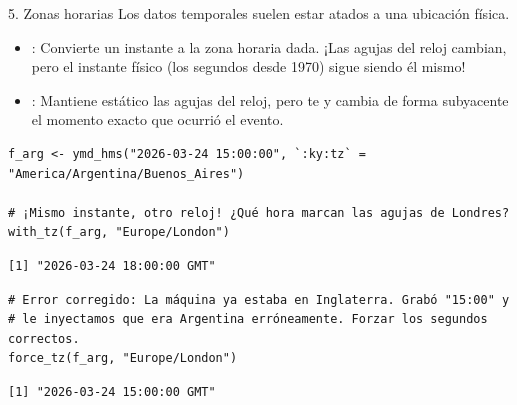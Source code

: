 \documentclass[8pt]{beamer}
\begin{document}
	\begin{frame}[fragile]{5. Zonas horarias}
		Los datos temporales suelen estar atados a una ubicación física.
		\begin{itemize}
			\item {}: Convierte un instante a la zona horaria dada. ¡Las agujas del reloj cambian, pero el instante físico (los segundos desde 1970) sigue siendo él mismo!
			\item {}: Mantiene estático las agujas del reloj, pero te  y cambia de forma subyacente el momento exacto que ocurrió el evento.
		\end{itemize}
		
\begin{lstlisting}[style=RScript]
f_arg <- ymd_hms("2026-03-24 15:00:00", `:ky:tz` = "America/Argentina/Buenos_Aires")

# ¡Mismo instante, otro reloj! ¿Qué hora marcan las agujas de Londres?
with_tz(f_arg, "Europe/London")
\end{lstlisting}
\begin{lstlisting}[style=RConsole]
[1] "2026-03-24 18:00:00 GMT"
\end{lstlisting}

\begin{lstlisting}[style=RScript]
# Error corregido: La máquina ya estaba en Inglaterra. Grabó "15:00" y 
# le inyectamos que era Argentina erróneamente. Forzar los segundos correctos.
force_tz(f_arg, "Europe/London")
\end{lstlisting}
\begin{lstlisting}[style=RConsole]
[1] "2026-03-24 15:00:00 GMT"
\end{lstlisting}
	\end{frame}
\end{document}
